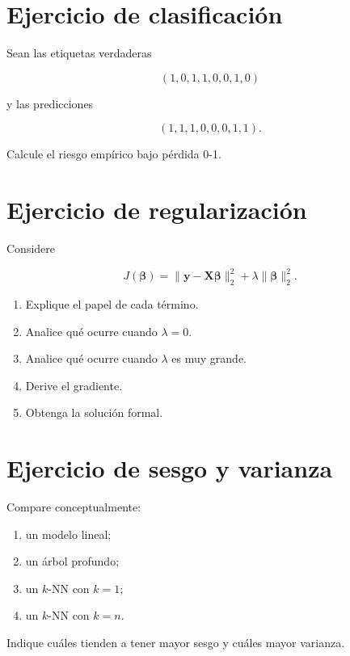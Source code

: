 \documentclass[
  spanish,
  11pt,
  letterpaper,
  DIV=11,
  numbers=noendperiod]{scrreprt}
\providecommand{\tightlist}{%
  \setlength{\itemsep}{0pt}\setlength{\parskip}{0pt}}
\theoremstyle{definition}
\theoremstyle{plain}
\theoremstyle{definition}
\theoremstyle{remark}
\begin{document}
\section{Ejercicio de
clasificación}\label{ejercicio-de-clasificaciuxf3n-1}

Sean las etiquetas verdaderas

\[
(1,0,1,1,0,0,1,0)
\]

y las predicciones

\[
(1,1,1,0,0,0,1,1).
\]

Calcule el riesgo empírico bajo pérdida 0-1.

\section{Ejercicio de
regularización}\label{ejercicio-de-regularizaciuxf3n}

Considere

\[
J(\boldsymbol{\beta})
=
\|
\mathbf{y}
-
\mathbf{X}\boldsymbol{\beta}
\|_2^2
+
\lambda
\|
\boldsymbol{\beta}
\|_2^2.
\]

\begin{enumerate}
\def\labelenumi{\arabic{enumi}.}
\tightlist
\item
  Explique el papel de cada término.
\item
  Analice qué ocurre cuando \(\lambda=0\).
\item
  Analice qué ocurre cuando \(\lambda\) es muy grande.
\item
  Derive el gradiente.
\item
  Obtenga la solución formal.
\end{enumerate}

\section{Ejercicio de sesgo y
varianza}\label{ejercicio-de-sesgo-y-varianza}

Compare conceptualmente:

\begin{enumerate}
\def\labelenumi{\arabic{enumi}.}
\tightlist
\item
  un modelo lineal;
\item
  un árbol profundo;
\item
  un \(k\)-NN con \(k=1\);
\item
  un \(k\)-NN con \(k=n\).
\end{enumerate}

Indique cuáles tienden a tener mayor sesgo y cuáles mayor varianza.
\end{document}
